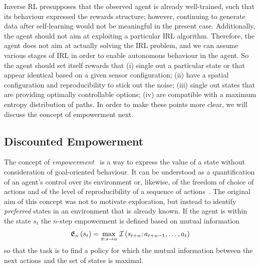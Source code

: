 \documentclass{article}
\begin{document}
Inverse RL presupposes that the observed agent is already well-trained, such that 
its behaviour expressed the rewards structure; however, continuing to generate data after
self-learning would not be meaningful in the present case. Additionally, the agent should not aim
at exploiting a particular IRL algorithm. Therefore, the agent does not aim at actually 
solving the IRL problem, and we can assume various stages of IRL in order 
to enable autonomous behaviour in the agent. So the agent should set itself rewards that
(i) single out a particular state or that appear identical based on a given sensor configuration;
(ii) have a spatial configuration and reproducibility to stick out the noise;
(iii) single out states that are providing optimally controllable options;
(iv) are compatible with a maximum entropy distribution of paths.
In order to make these points more clear, we will discuss the concept of empowerment next.


\subsection{Discounted Empowerment\label{emp}\label{gammares}}

The concept of \emph{empowerment}~\citep{klyubin2005empowerment} is a way to 
express the value of a state without consideration of goal-oriented behaviour.
It can be understood as a quantification of an agent's control over its environment
or, likewise, of the freedom of choice of actions and of the 
level of reproducibility of a sequence of actions~\citep{salge2014empowerment}.
The original aim  of this concept was not to motivate exploration, 
but instead to identify \emph{preferred} states in an environment that is already known.
If the agent is within the state $s_t$ the $n$-step empowerment is defined based on mutual 
information
\begin{equation}
\mathfrak{E}_{n}\left(s_{t}\right)=\max_{\pi:s\to a}\,{\cal I}\left(s_{t+n};a_{t+n-1},\dots,a_{t}\right)\label{eq:n_powerment}
\end{equation}
so that the task is to find a policy for which the mutual information between the next actions and the set of states is maximal.
\end{document}
